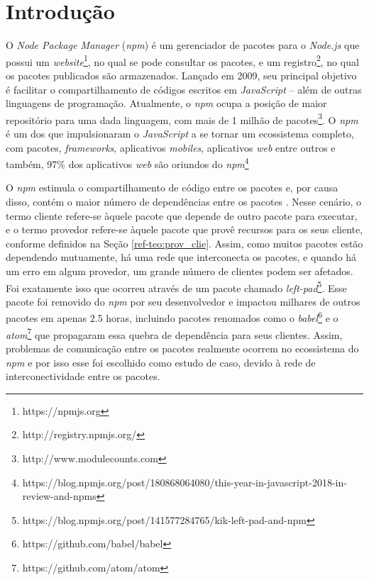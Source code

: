 \chapter{Introdução}
\label{cap:introducao}

O \textit{Node Package Manager} (\textit{npm}) é um gerenciador de pacotes para o \textit{Node.js} que possui um \textit{website}\footnote{https://npmjs.org}, no qual se pode consultar os pacotes, e um registro\footnote{http://registry.npmjs.org/}, no qual os pacotes publicados são armazenados. Lançado em 2009, seu principal objetivo é facilitar o compartilhamento de códigos escritos em \textit{JavaScript} -- além de outras linguagens de programação. Atualmente, o \textit{npm} ocupa a posição de maior repositório para uma dada linguagem, com mais de 1 milhão de pacotes\footnote{http://www.modulecounts.com}. O \textit{npm} é um dos que impulsionaram o \textit{JavaScript} a se tornar um ecossistema completo, com pacotes, \textit{frameworks}, aplicativos \textit{mobiles}, aplicativos \textit{web} entre outros \cite{introduction:npm} e também,  97\% dos aplicativos \textit{web} são oriundos do \textit{npm}\footnote{https://blog.npmjs.org/post/180868064080/this-year-in-javascript-2018-in-review-and-npms}

O \textit{npm} estimula o compartilhamento de código entre os pacotes e, por causa disso, contém o maior número de dependências entre os pacotes \cite{teorical_reference:npm_2}. Nesse cenário, o termo cliente refere-se àquele pacote que depende de outro pacote para executar, e o termo provedor refere-se àquele pacote que provê recursos para os seus cliente, conforme definidos na Seção \ref{ref-teo:prov_clie}. Assim, como muitos pacotes estão dependendo mutuamente, há uma rede que interconecta os pacotes, e quando há um erro em algum provedor, um grande número de clientes podem ser afetados. Foi exatamente isso que ocorreu através de um pacote chamado \textit{left-pad}\footnote{https://blog.npmjs.org/post/141577284765/kik-left-pad-and-npm}. Esse pacote foi removido do \textit{npm} por seu desenvolvedor e impactou milhares de outros pacotes em apenas 2.5 horas, incluindo pacotes renomados como o \textit{babel}\footnote{https://github.com/babel/babel} e o \textit{atom}\footnote{https://github.com/atom/atom} que propagaram essa quebra de dependência para seus clientes. Assim, problemas de comunicação entre os pacotes realmente ocorrem no ecossistema do \textit{npm} e por isso esse foi escolhido como estudo de caso, devido à rede de interconectividade entre os pacotes.

